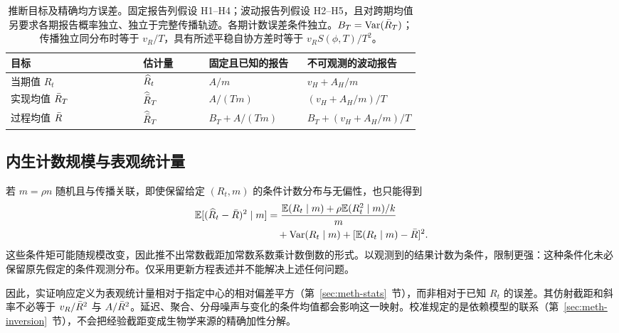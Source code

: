 \begin{table}[t]
\centering
\small
\setlength{\tabcolsep}{4pt}
\caption{推断目标及精确均方误差。固定报告列假设 H1--H4；波动报告列假设 H2--H5，且对跨期均值另要求各期报告概率独立、独立于完整传播轨迹。各期计数误差条件独立。$B_T=\mathrm{Var}(\bar R_T)$；传播独立同分布时等于 $v_R/T$，具有所述平稳自协方差时等于 $v_RS(\phi,T)/T^2$。}
\label{tab:targets}
\begin{tabularx}{\linewidth}{>{\raggedright\arraybackslash}X>{\centering\arraybackslash}p{0.16\linewidth}>{\centering\arraybackslash}p{0.24\linewidth}>{\centering\arraybackslash}p{0.27\linewidth}}
\toprule
目标 & 估计量 & 固定且已知的报告 & 不可观测的波动报告 \\
\midrule
当期值 $R_t$ & $\widehat R_t$ & $A/m$ & $v_H+A_H/m$ \\
实现均值 $\bar R_T$ & $\widehat{\bar R}_T$ & $A/(Tm)$ & $(v_H+A_H/m)/T$ \\
过程均值 $\bar R$ & $\widehat{\bar R}_T$ & $B_T+A/(Tm)$ & $B_T+(v_H+A_H/m)/T$ \\
\bottomrule
\end{tabularx}
\end{table}

\subsection{内生计数规模与表观统计量}
\label{sec:bg-scope}

若 $m=\rho n$ 随机且与传播关联，即使保留给定 $(R_t,m)$ 的条件计数分布与无偏性，也只能得到
\begin{equation}
\begin{aligned}
 \mathbb{E}[(\widehat R_t-\bar R)^2\mid m]
 &=\frac{\mathbb{E}(R_t\mid m)+\rho\mathbb{E}(R_t^2\mid m)/k}{m}\\
 &\quad+\mathrm{Var}(R_t\mid m)+[\mathbb{E}(R_t\mid m)-\bar R]^2.
\end{aligned}
\label{eq:endogenous-risk}
\end{equation}
这些条件矩可能随规模改变，因此推不出常数截距加常数系数乘计数倒数的形式。以观测到的结果计数为条件，限制更强：这种条件化未必保留原先假定的条件观测分布。仅采用更新方程表述并不能解决上述任何问题。

因此，实证响应定义为表观统计量相对于指定中心的相对偏差平方（第~\ref{sec:meth-stats}~节），而非相对于已知 $R_t$ 的误差。其仿射截距和斜率不必等于 $v_R/\bar R^2$ 与 $A/\bar R^2$。延迟、聚合、分母噪声与变化的条件均值都会影响这一映射。校准规定的是依赖模型的联系（第~\ref{sec:meth-inversion}~节），不会把经验截距变成生物学来源的精确加性分解。
